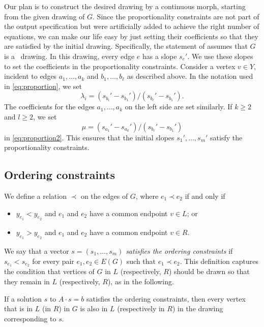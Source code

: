 Our plan is to construct the desired drawing by a continuous morph, 
starting from the given drawing of $G$. Since the proportionality 
constraints are not part of the output specification but were 
artificially added to achieve the right number of equations, we can make 
our life easy by just setting their coefficients so that they are 
satisfied by the initial drawing.
Specifically, the statement of  assumes that $G$ is a
\Fary\ drawing.  In this drawing, every edge $e$
has a slope $s_e'$.
We use these slopes to set the
coefficients in the proportionality constraints.
Consider a
vertex $v\in Y$, incident to edges $a_1,\ldots,a_k$ and $b_1,\ldots,b_\ell$
as described above.
In the notation used
in \eqref{eq:proportion}, we set
\[
\lambda_i = (s_{b_i}'-s_{b_1}')/(s_{b_\ell}'-s_{b_1}') .
\]
The coefficients for the edges
 $a_1,\ldots,a_k$ on the left side are set similarly.
If $k\ge2$ and $l\ge 2$,
we set
\[
\mu = (s_{a_1}'-s_{a_k}')/(s_{b_\ell}'-s_{b_1}')
\]
 in \eqref{eq:proportion2}.
This ensures that the initial slopes $s_{1}',\ldots,s_{m}'$ satisfy the
proportionality constraints.


\subsection{Ordering constraints}

We define a relation $\prec$ on the edges of $G$, where $e_1 \prec e_2$ if and only if
\begin{itemize}
	\item $y_{e_1} < y_{e_2}$ and $e_1$ and $e_2$ have a common endpoint $v\in L$; or
	\item $y_{e_1} > y_{e_2}$ and $e_1$ and $e_2$ have a common endpoint $v\in R$.
\end{itemize}
We say that a vector $s=(s_1,\ldots,s_m)$ \emph{satisfies the ordering
	constraints} if $s_{e_1} < s_{e_2}$ for every pair $e_1,e_2\in E(G)$
such that $e_1\prec e_2$. This definition captures the condition that vertices of $G$ in $L$ (respectively, $R$) should be drawn so that they remain in $L$ (respectively, $R$), as in the following. 

\begin{obs}
If a solution $s$ to $A\cdot s=b$ satisfies the ordering constraints, then every vertex that is in $L$ (in $R$) in $G$ is also in $L$ (respectively in $R$) in the drawing corresponding to $s$. 
\end{obs}

